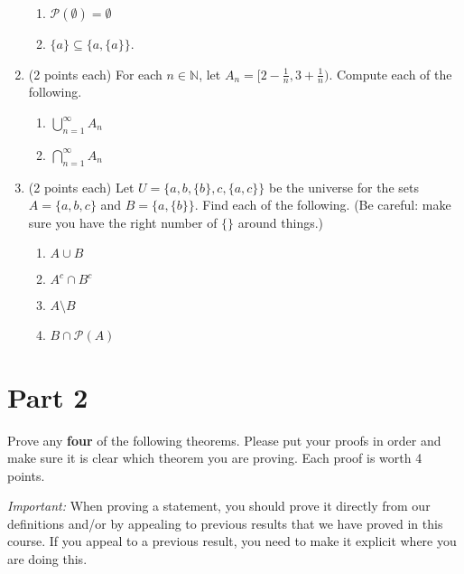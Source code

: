 \documentclass[11pt]{article}
\theoremstyle{definition}
\begin{document}
\begin{enumerate}
\begin{enumerate}
\item $\mathcal{P}(\emptyset)=\emptyset$

\item $\{a\} \subseteq \{a,\{a\}\}$.

\end{enumerate}

\item (2 points each)  For each $n \in \mathbb{N}$, let $A_{n}=[2-\frac{1}{n},3+\frac{1}{n})$.  Compute each of the following.

\begin{enumerate}

\item $\displaystyle \bigcup_{n=1}^{\infty}A_{n}$

\item $\displaystyle \bigcap_{n=1}^{\infty}A_{n}$

\end{enumerate}

\item (2 points each)  Let $U=\{a,b, \{b\}, c, \{a,c\}\}$ be the universe for the sets $A=\{a,b,c\}$ and $B=\{a,\{b\}\}$.  Find each of the following.  (Be careful: make sure you have the right number of $\{\}$ around things.)

\begin{enumerate}

\item $A \cup B$

\item $A^{c} \cap B^{c}$

\item $A\setminus B$

\item $B \cap \mathcal{P}(A)$

\end{enumerate}

\end{enumerate}

\section*{Part 2}

Prove any \textbf{four} of the following theorems.  Please put your proofs in order and make sure it is clear which theorem you are proving.  Each proof is worth 4 points.

\bigskip

\emph{Important:} When proving a statement, you should prove it directly from our definitions and/or by appealing to previous results that we have proved in this course.  If you appeal to a previous result, you need to make it explicit where you are doing this.
\end{document}
